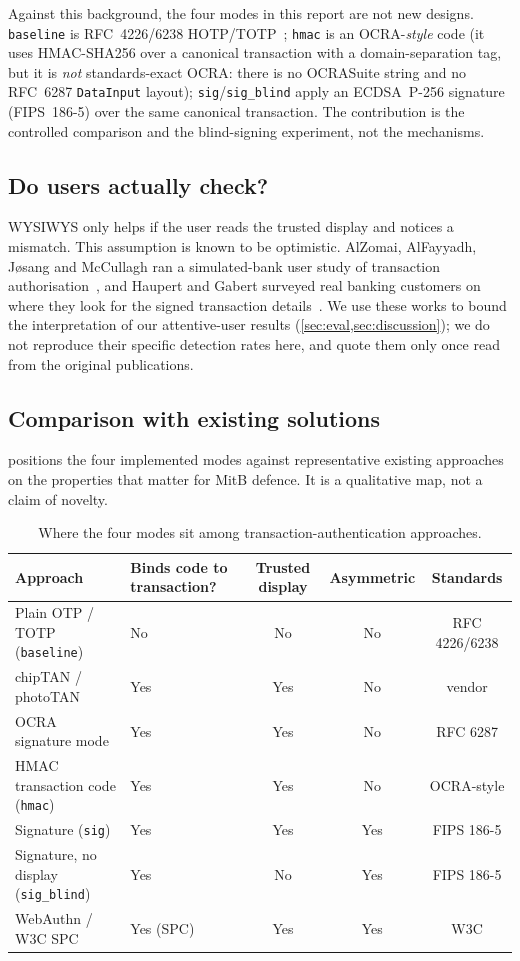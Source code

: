 Against this background, the four modes in this report are not new designs.
\texttt{baseline} is RFC~4226/6238 HOTP/TOTP~\cite{rfc4226,rfc6238};
\texttt{hmac} is an OCRA-\emph{style} code (it uses HMAC-SHA256 over a canonical
transaction with a domain-separation tag, but it is \emph{not} standards-exact
OCRA: there is no OCRASuite string and no RFC~6287 \texttt{DataInput} layout);
\texttt{sig}/\texttt{sig\_blind} apply an ECDSA~P-256 signature (FIPS~186-5) over
the same canonical transaction. The contribution is the controlled comparison
and the blind-signing experiment, not the mechanisms.

\subsection{Do users actually check?}
WYSIWYS only helps if the user reads the trusted display and notices a mismatch.
This assumption is known to be optimistic. AlZomai, AlFayyadh, J\o sang and
McCullagh ran a simulated-bank user study of transaction
authorisation~\cite{alzomai2008}, and Haupert and Gabert surveyed real banking
customers on where they look for the signed transaction
details~\cite{haupert2019}. We use these works to bound the interpretation of
our attentive-user results (\cref{sec:eval,sec:discussion}); we do not reproduce
their specific detection rates here, and quote them only once read from the
original publications.

\subsection{Comparison with existing solutions}
 positions the four implemented modes against representative
existing approaches on the properties that matter for MitB defence. It is a
qualitative map, not a claim of novelty.

\begin{table}[htbp]
\centering
\caption{Where the four modes sit among transaction-authentication approaches.}
\label{tab:compare}
\small
\begin{tabularx}{\linewidth}{@{}lXccc@{}}
\toprule
Approach & Binds code to transaction? & Trusted display & Asymmetric & Standards \\
\midrule
Plain OTP / TOTP (\texttt{baseline})   & No  & No  & No  & RFC 4226/6238 \\
chipTAN / photoTAN                     & Yes & Yes & No  & vendor \\
OCRA signature mode                    & Yes & Yes & No  & RFC 6287 \\
HMAC transaction code (\texttt{hmac})  & Yes & Yes & No  & OCRA-style \\
Signature (\texttt{sig})               & Yes & Yes & Yes & FIPS 186-5 \\
Signature, no display (\texttt{sig\_blind}) & Yes & No & Yes & FIPS 186-5 \\
WebAuthn / W3C SPC                     & Yes (SPC) & Yes & Yes & W3C \\
\bottomrule
\end{tabularx}
\end{table}
